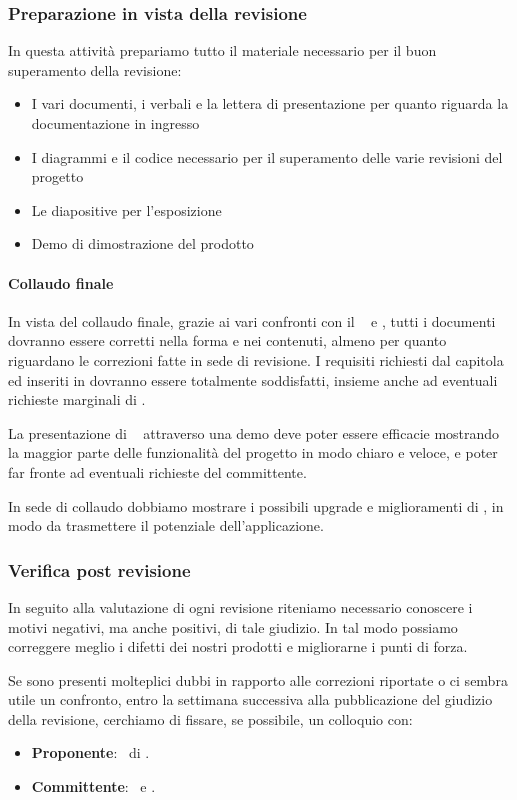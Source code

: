         \subsubsection{Preparazione in vista della revisione}
		In questa attività prepariamo tutto il materiale necessario per il buon superamento della revisione:
		\begin{itemize}
			\item I vari documenti, i verbali e la lettera di presentazione per quanto riguarda la documentazione in ingresso
			\item I diagrammi  e il codice necessario per il superamento delle varie revisioni del progetto
			\item Le diapositive per l'esposizione
            \item Demo di dimostrazione del prodotto
		\end{itemize}
    
        \paragraph{Collaudo finale}
        In vista del collaudo finale, grazie ai vari confronti con il \TV~ e \DZ, tutti i documenti dovranno essere corretti nella forma e nei contenuti, almeno per quanto riguardano le correzioni fatte in sede di revisione. I requisiti richiesti dal capitola ed inseriti in \AdRd dovranno essere totalmente soddisfatti, insieme anche ad eventuali richieste marginali di \DZ. \par
        La presentazione di \progetto~ attraverso una demo deve poter essere efficacie mostrando la maggior parte delle funzionalità del progetto in modo chiaro e veloce, e poter far fronte ad eventuali richieste del committente. \par
        In sede di collaudo dobbiamo mostrare i possibili upgrade e miglioramenti di \progetto, in modo da trasmettere il potenziale dell'applicazione.



		\subsubsection{Verifica post revisione} \label{verificapostrevisione}
        In seguito alla valutazione di ogni revisione riteniamo necessario conoscere i motivi negativi, ma anche positivi, di tale giudizio. In tal modo possiamo correggere meglio i difetti dei nostri prodotti e migliorarne i punti di forza. \par
        Se sono presenti molteplici dubbi in rapporto alle correzioni riportate o ci sembra utile un confronto, entro la settimana successiva alla pubblicazione del giudizio della revisione, cerchiamo di fissare, se possibile, un colloquio con:
        \begin{itemize}
            \item \textbf{Proponente}: \DZ\ di \II.
            \item \textbf{Committente}: \TV\ e \RC.
		\end{itemize}
    
